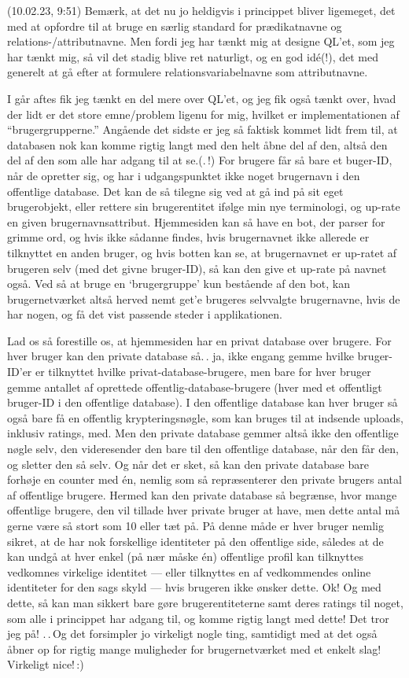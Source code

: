 \documentclass{report}
\begin{document}
(10.02.23, 9:51) Bemærk, at det nu jo heldigvis i princippet bliver ligemeget, det med at opfordre til at bruge en særlig standard for prædikatnavne og relations-/attributnavne. Men fordi jeg har tænkt mig at designe QL'et, som jeg har tænkt mig, så vil det stadig blive ret naturligt, og en god idé(!), det med generelt at gå efter at formulere relationsvariabelnavne som attributnavne. 

I går aftes fik jeg tænkt en del mere over QL'et, og jeg fik også tænkt over, hvad der lidt er det store emne/problem ligenu for mig, hvilket er implementationen af ``brugergrupperne.'' Angående det sidste er jeg så faktisk kommet lidt frem til, at databasen nok kan komme rigtig langt med den helt åbne del af den, altså den del af den som alle har adgang til at se.(.\,!) For brugere får så bare et buger-ID, når de opretter sig, og har i udgangspunktet ikke noget brugernavn i den offentlige database. Det kan de så tilegne sig ved at gå ind på sit eget brugerobjekt, eller rettere sin brugerentitet ifølge min nye terminologi, og up-rate en given brugernavnsattribut. Hjemmesiden kan så have en bot, der parser for grimme ord, og hvis ikke sådanne findes, hvis brugernavnet ikke allerede er tilknyttet en anden bruger, og hvis botten kan se, at brugernavnet er up-ratet af brugeren selv (med det givne bruger-ID), så kan den give et up-rate på navnet også. Ved så at bruge en `brugergruppe' kun bestående af den bot, kan brugernetværket altså herved nemt get'e brugeres selvvalgte brugernavne, hvis de har nogen, og få det vist passende steder i applikationen. 

Lad os så forestille os, at hjemmesiden har en privat database over brugere. For hver bruger kan den private database så.\,. ja, ikke engang gemme hvilke bruger-ID'er er tilknyttet hvilke privat-database-brugere, men bare for hver bruger gemme antallet af oprettede offentlig-database-brugere (hver med et offentligt bruger-ID i den offentlige database). I den offentlige database kan hver bruger så også bare få en offentlig krypteringsnøgle, som kan bruges til at indsende uploads, inklusiv ratings, med. Men den private database gemmer altså ikke den offentlige nøgle selv, den videresender den bare til den offentlige database, når den får den, og sletter den så selv. Og når det er sket, så kan den private database bare forhøje en counter med én, nemlig som så repræsenterer den private brugers antal af offentlige brugere. Hermed kan den private database så begrænse, hvor mange offentlige brugere, den vil tillade hver private bruger at have, men dette antal må gerne være så stort som 10 eller tæt på. På denne måde er hver bruger nemlig sikret, at de har nok forskellige identiteter på den offentlige side, således at de kan undgå at hver enkel (på nær måske én) offentlige profil kan tilknyttes vedkomnes virkelige identitet --- eller tilknyttes en af vedkommendes online identiteter for den sags skyld --- hvis brugeren ikke ønsker dette. Ok! Og med dette, så kan man sikkert bare gøre brugerentiteterne samt deres ratings til noget, som alle i princippet har adgang til, og komme rigtig langt med dette! Det tror jeg på! .\,.\,Og det forsimpler jo virkeligt nogle ting, samtidigt med at det også åbner op for rigtig mange muligheder for brugernetværket med et enkelt slag! Virkeligt nice!\,:) 
\end{document}
